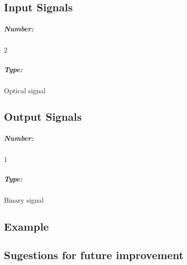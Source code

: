%

\subsection*{Input Signals}

\subparagraph*{Number:} 2

\subparagraph*{Type:} Optical signal

\subsection*{Output Signals}

\subparagraph*{Number:} 1

\subparagraph*{Type:} Binary signal

\subsection*{Example}

\subsection*{Sugestions for future improvement}
